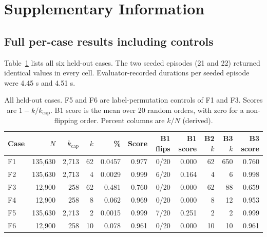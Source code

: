 \documentclass{article}
\newcommand{\kcap}{k_{\mathrm{cap}}}
\begin{document}
\clearpage
\appendix
\section{Supplementary Information}

\subsection{Full per-case results including controls}
Table~\ref{tab:full} lists all six held-out cases. The two seeded episodes (21 and 22) returned identical values in every cell. Evaluator-recorded durations per seeded episode were 4.45 s and 4.51 s.

\begin{table}[h]
\centering
\caption{All held-out cases. F5 and F6 are label-permutation controls of F1 and F3. Scores are $1-k/\kcap$. B1 score is the mean over 20 random orders, with zero for a non-flipping order. Percent columns are $k/N$ (derived).}
\label{tab:full}
\footnotesize
\setlength{\tabcolsep}{4pt}
\begin{tabular}{lrrrrrrrrrr}
\toprule
Case & $N$ & $\kcap$ & $k$ & \% & Score & B1 flips & B1 score & B2 $k$ & B3 $k$ & B3 score\\
\midrule
F1 & 135,630 & 2,713 & 62 & 0.0457 & 0.977 & 0/20 & 0.000 & 62 & 650 & 0.760\\
F2 & 135,630 & 2,713 & 4 & 0.0029 & 0.999 & 6/20 & 0.164 & 4 & 6 & 0.998\\
F3 & 12,900 & 258 & 62 & 0.481 & 0.760 & 0/20 & 0.000 & 62 & 88 & 0.659\\
F4 & 12,900 & 258 & 8 & 0.062 & 0.969 & 0/20 & 0.000 & 8 & 12 & 0.953\\
F5 & 135,630 & 2,713 & 2 & 0.0015 & 0.999 & 7/20 & 0.251 & 2 & 2 & 0.999\\
F6 & 12,900 & 258 & 10 & 0.078 & 0.961 & 0/20 & 0.000 & 10 & 10 & 0.961\\
\bottomrule
\end{tabular}
\end{table}
\end{document}
